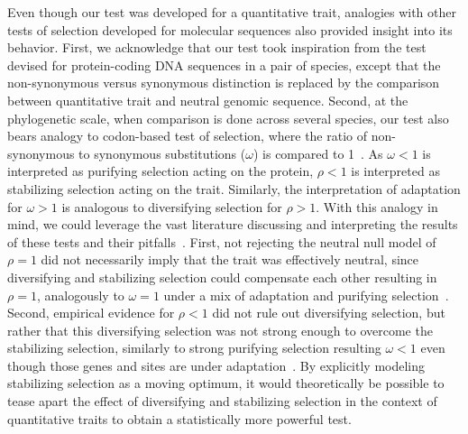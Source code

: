 \documentclass{article}
\newcommand{\dnds}{\omega}
\newcommand{\NI}{\rho}
\begin{document}
Even though our test was developed for a quantitative trait, analogies with other tests of selection developed for molecular sequences also provided insight into its behavior.
First, we acknowledge that our test took inspiration from the \citet{mcdonald_adaptative_1991} test devised for protein-coding DNA sequences in a pair of species, except that the non-synonymous versus synonymous distinction is replaced by the comparison between quantitative trait and neutral genomic sequence.
Second, at the phylogenetic scale, when comparison is done across several species, our test also bears analogy to codon-based test of selection, where the ratio of non-synonymous to synonymous substitutions ($\dnds$) is compared to 1~\citep{goldman_codonbased_1994, muse_likelihood_1994}.
As $\dnds < 1$ is interpreted as purifying selection acting on the protein, $\NI < 1$ is interpreted as stabilizing selection acting on the trait.
Similarly, the interpretation of adaptation for $\dnds > 1$ is analogous to diversifying selection for $\NI > 1$.
With this analogy in mind, we could leverage the vast literature discussing and interpreting the results of these tests and their pitfalls~\citep{nielsen_molecular_2005, anisimova_investigating_2009, jensen_importance_2019}.
First, not rejecting the neutral null model of $\NI = 1$ did not necessarily imply that the trait was effectively neutral, since diversifying and stabilizing selection could compensate each other resulting in $\NI = 1$, analogously to $\dnds=1$ under a mix of adaptation and purifying selection~\citep{nielsen_molecular_2005}.
Second, empirical evidence for $\NI < 1$ did not rule out diversifying selection, but rather that this diversifying selection was not strong enough to overcome the stabilizing selection, similarly to strong purifying selection resulting $\dnds < 1$ even though those genes and sites are under adaptation~\citep{latrille_genes_2023}.
By explicitly modeling stabilizing selection as a moving optimum, it would theoretically be possible to tease apart the effect of diversifying and stabilizing selection in the context of quantitative traits to obtain a statistically more powerful test.
\end{document}
